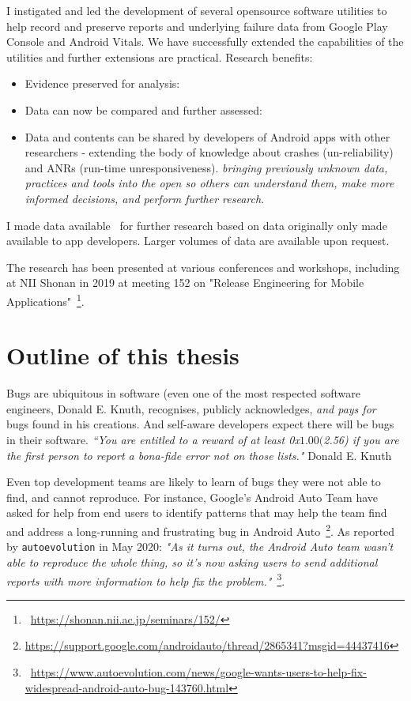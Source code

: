I instigated and led the development of several opensource software utilities to help record and preserve reports and underlying failure data from Google Play Console and Android Vitals. We have successfully extended the capabilities of the utilities and further extensions are practical. Research benefits:
\begin{itemize}
    \item Evidence preserved for analysis:
    \item Data can now be compared and further assessed:
    \item Data and contents can be shared by developers of Android apps with other researchers - extending the body of knowledge about crashes (un-reliability) and ANRs (run-time unresponsiveness). \emph{bringing previously unknown data, practices and tools into the open so others can understand them, make more informed decisions, and perform further research.}
\end{itemize}

I made data available~\cite{harty_wama_dataset_examples} for further research based on data originally only made available to app developers. Larger volumes of data are available upon request.

The research has been presented at various conferences and workshops, including at NII Shonan in 2019 at meeting 152 on "Release Engineering for Mobile Applications"~\footnote{~\url{https://shonan.nii.ac.jp/seminars/152/}}. 

\section{Outline of this thesis}
Bugs are ubiquitous in software (even one of the most respected software engineers, Donald E. Knuth, recognises, publicly acknowledges, \emph{and pays for}~\cite{knuth_trutex, wikipedia__knuth_reward_checks_2020} bugs found in his creations. And self-aware developers expect there will be bugs in their software. \emph{``You are entitled to a reward of at least 0x$1.00 ($2.56) if you are the first person to report a bona-fide error not on those lists."} Donald E. Knuth~\cite{knuth_the_bank_of_san_serriffe}

Even top development teams are likely to learn of bugs they were not able to find, and cannot reproduce. For instance, Google's Android Auto Team have asked for help from end users to identify patterns that may help the team find and address a long-running and frustrating bug in Android Auto~\footnote{\url{https://support.google.com/androidauto/thread/2865341?msgid=44437416}}. As reported by \texttt{autoevolution} in May 2020:  
\emph{"As it turns out, the Android Auto team wasn’t able to reproduce the whole thing, so it’s now asking users to send additional reports with more information to help fix the problem."}~\footnote{~\url{https://www.autoevolution.com/news/google-wants-users-to-help-fix-widespread-android-auto-bug-143760.html}}.

